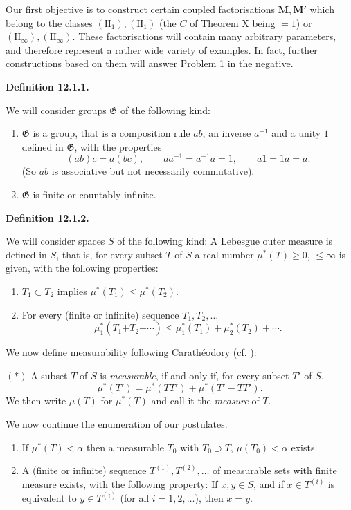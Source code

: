 \documentclass[12pt,b5paper,twoside]{article}
\newcommand{\M}{\mathbf M}
\newcommand{\Definition}[1]{%
  \par\smallskip\noindent\phantomsection\label{def:#1}\textbf{Definition #1.}\enspace
}
\newcommand{\thmref}[1]{\hyperref[thm:#1]{Theorem #1}}
\newcommand{\probref}[1]{\hyperref[prob:#1]{Problem #1}}
\begin{document}
Our first objective is to construct certain coupled factorisations $\M,\M'$
which belong to the classes $(\mathrm{II}_1),(\mathrm{II}_1)$ (the $C$ of
\thmref{X} being $=1$) or
$(\mathrm{II}_\infty),(\mathrm{II}_\infty)$. These factorisations will
contain many arbitrary parameters, and therefore represent a rather wide
variety of examples. In fact, further constructions based on them will answer
\probref{1} in the negative.

\Definition{12.1.1}
We will consider groups $\mathfrak G$ of the following kind:
\begin{enumerate}[label=(\roman*)]
\item $\mathfrak G$ is a group, that is a composition rule $ab$, an inverse
  $a^{-1}$ and a unity $1$ defined in $\mathfrak G$, with the properties
  \[
    (ab)c=a(bc),\qquad aa^{-1}=a^{-1}a=1,\qquad a1=1a=a.
  \]
  (So $ab$ is associative but not necessarily commutative).
\item $\mathfrak G$ is finite or countably infinite.
\end{enumerate}

\Definition{12.1.2}
We will consider spaces $S$ of the following kind: A Lebesgue outer measure is
defined in $S$, that is, for every subset $T$ of $S$ a real number
$\mu^*(T)\geq0$, $\leq\infty$ is given, with the following properties:
\begin{enumerate}[label=(\roman*)]
\item $T_1\subset T_2$ implies $\mu^*(T_1)\leq\mu^*(T_2)$.
\item For every (finite or infinite) sequence $T_1,T_2,\ldots$
  \[
    \mu_1^*(T_1\mathbin{\dot+}T_2\mathbin{\dot+}\cdots)
    \leq\mu_1^*(T_1)+\mu_2^*(T_2)+\cdots.
  \]
\end{enumerate}
We now define measurability following Carath\'eodory
(cf. \cite[p.~246]{ref4}):

\noindent$(*)$ A subset $T$ of $S$ is \emph{measurable}, if and only if, for
every subset $T'$ of $S$,
\[
 \mu^*(T')=\mu^*(TT')+\mu^*(T'-TT').
\]
We then write $\mu(T)$ for $\mu^*(T)$ and call it the \emph{measure} of $T$.

We now continue the enumeration of our postulates.
\begin{enumerate}[label=(\roman*),start=3]
\item If $\mu^*(T)<\alpha$ then a measurable $T_0$ with $T_0\supset T$,
  $\mu(T_0)<\alpha$ exists.
\item A (finite or infinite) sequence $T^{(1)},T^{(2)},\ldots$ of measurable
  sets with finite measure exists, with the following property: If $x,y\in S$,
  and if $x\in T^{(i)}$ is equivalent to $y\in T^{(i)}$ (for all
  $i=1,2,\ldots$), then $x=y$.
\end{enumerate}
\end{document}
